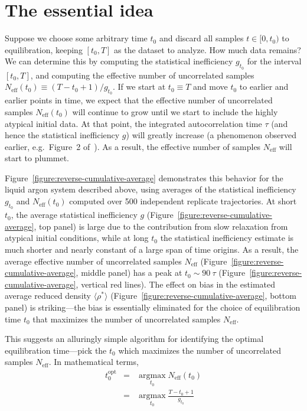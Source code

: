 \documentclass[aps,pre,twocolumn,nofootinbib,superscriptaddress,linenumbers,11point]{revtex4-1}
\newcommand{\expect}[1]{\langle #1 \rangle}                %
\DeclareMathOperator*{\argmax}{argmax}
\newcommand*{\argmaxl}{\argmax\limits}
\begin{document}
\section*{The essential idea}
\label{section:the-idea}

Suppose we choose some arbitrary time $t_0$ and discard all samples $t \in [0, t_0)$ to equilibration, keeping $[t_0, T]$ as the dataset to analyze.
How much data remains?
We can determine this by computing the statistical inefficiency $g_{t_0}$ for the interval $[t_0, T]$, and computing the effective number of uncorrelated samples $N_\mathrm{eff}(t_0) \equiv (T - t_0 + 1) / g_{t_0}$.
If we start at $t_0 \equiv T$ and move $t_0$ to earlier and earlier points in time, we expect that the effective number of uncorrelated samples $N_\mathrm{eff}(t_0)$ will continue to grow until we start to include the highly atypical initial data.
At that point, the integrated autocorrelation time $\tau$ (and hence the statistical inefficiency $g$) will greatly increase (a phenomenon observed earlier, e.g.~Figure~2 of~\cite{yang-karplus:2004:jcp:reverse-cumulative-averaging}).
As a result, the effective number of samples $N_\mathrm{eff}$ will start to plummet.

Figure~\ref{figure:reverse-cumulative-average} demonstrates this behavior for the liquid argon system described above, using averages of the statistical inefficiency $g_{t_0}$ and $N_\mathrm{eff}(t_0)$ computed over 500 independent replicate trajectories.
At short $t_0$, the average statistical inefficiency $g$ (Figure~\ref{figure:reverse-cumulative-average}, top panel) is large due to the contribution from slow relaxation from atypical initial conditions, while at long $t_0$ the statistical inefficiency estimate is much shorter and nearly constant of a large span of time origins.
As a result, the average effective number of uncorrelated samples $N_\mathrm{eff}$ (Figure~\ref{figure:reverse-cumulative-average}, middle panel) has a peak at $t_0 \sim 90~\tau$ (Figure~\ref{figure:reverse-cumulative-average}, vertical red lines).
The effect on bias in the estimated average reduced density $\expect{\rho^*}$ (Figure~\ref{figure:reverse-cumulative-average}, bottom panel) is striking---the bias is essentially eliminated for the choice of equilibration time $t_0$ that maximizes the number of uncorrelated samples $N_\mathrm{eff}$.

This suggests an alluringly simple algorithm for identifying the optimal equilibration time---pick the $t_0$ which maximizes the number of uncorrelated samples $N_\mathrm{eff}$.
In mathematical terms, 
\begin{eqnarray}
t_0^\mathrm{opt} &=& \argmaxl_{t_0} N_\mathrm{eff}(t_0) \label{equation:optimal-equilibration-time} \\
&=& \argmaxl_{t_0}  \frac{T - t_0 + 1}{g_{t_0}} \nonumber
\end{eqnarray}
\end{document}
